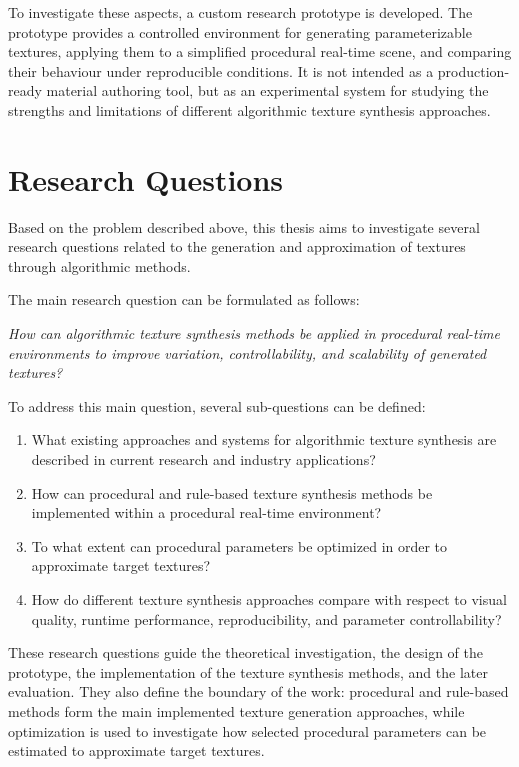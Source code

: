 To investigate these aspects, a custom research prototype is developed. The prototype provides a controlled environment for generating parameterizable textures, applying them to a simplified procedural real-time scene, and comparing their behaviour under reproducible conditions. It is not intended as a production-ready material authoring tool, but as an experimental system for studying the strengths and limitations of different algorithmic texture synthesis approaches.

\section{Research Questions}

Based on the problem described above, this thesis aims to investigate several research questions related to the generation and approximation of textures through algorithmic methods.

The main research question can be formulated as follows:

\textit{How can algorithmic texture synthesis methods be applied in procedural real-time environments to improve variation, controllability, and scalability of generated textures?}

To address this main question, several sub-questions can be defined:

\begin{enumerate}
    \item What existing approaches and systems for algorithmic texture synthesis are described in current research and industry applications?
    \item How can procedural and rule-based texture synthesis methods be implemented within a procedural real-time environment?
    \item To what extent can procedural parameters be optimized in order to approximate target textures?
    \item How do different texture synthesis approaches compare with respect to visual quality, runtime performance, reproducibility, and parameter controllability?
\end{enumerate}

These research questions guide the theoretical investigation, the design of the prototype, the implementation of the texture synthesis methods, and the later evaluation. They also define the boundary of the work: procedural and rule-based methods form the main implemented texture generation approaches, while optimization is used to investigate how selected procedural parameters can be estimated to approximate target textures.

